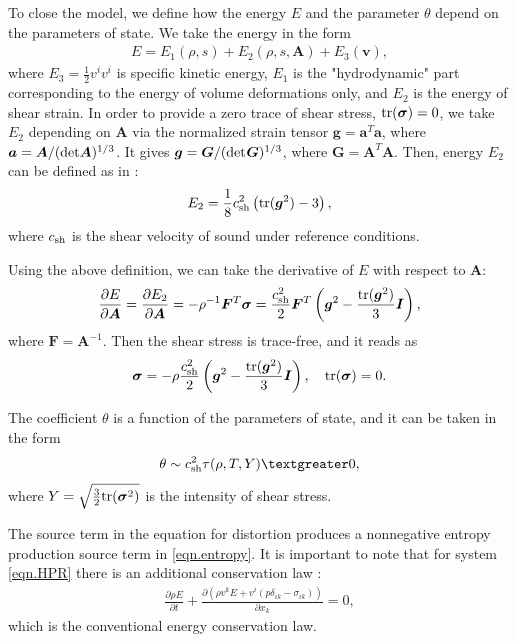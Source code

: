 \documentclass[3p,times,table]{article}
\renewcommand{\AA}{{\bm{A}}}
\renewcommand{\aa}{{\bm{a}}}
\renewcommand{\ggg}{{\bm{g}}}
\newcommand{\GG}{{\boldsymbol{G}}}
\newcommand{\vv}{{\bm{v}}}
\newcommand{\FF}{{\bm{F}}}
\newcommand{\tr}{\textnormal{tr}}
\newcommand{\csh}{c_{\rm sh}}
\begin{document}
To close the model, we define how the energy $E$ and the parameter $\theta$ depend on the parameters of state.
We take the energy in the form
\begin{align}
E=E_1(\rho,s)+E_2(\rho,s,\AA)+E_3(\vv), \label{energy}
\end{align}
where $E_3=\frac{1}{2}v^iv^i$ is specific kinetic energy,
$E_1$ is the "hydrodynamic" part corresponding to the energy of  volume deformations only,
and $E_2$ is the energy of shear strain.
In order to provide a zero trace of shear stress, $\tr (\bm{\sigma})=0$, we take 
$E_2$ depending on $\AA$ via the normalized strain tensor $\ggg=\aa^T\aa$, 
where 
$\aa=\AA/(\det\hspace{-0.6mm}\AA)^{1/3}$. It gives  
$\ggg=\GG/(\det\hspace{-0.4mm}\GG)^{1/3}$, where 
$\GG=\AA^T\AA$. Then, energy $ E_2 $ can be 
defined as in \cite{Ndanou2014}:
\begin{align}
E_2=\frac{1}{8}\csh^2\left(\tr({\ggg^2})-3\right),
\end{align}
where $\csh$ is the shear velocity of sound under reference conditions.

Using the above definition, we can take
the derivative of $E$ with respect to $\AA$:
\begin{align} \label{EderivA}
\frac{\partial E}{\partial \AA}=\frac{\partial E_2}{\partial 
\AA}=-\rho^{-1}\FF^T\bm{\sigma}=
\frac{\csh^2}{2} \bm{F}^T \left(\ggg^2-\frac{\tr({\ggg^2})}{3} \bm{I} \right),
\end{align}
where $\FF=\AA^{-1}$.
Then the shear stress is trace-free, and it reads as
\begin{align}
\bm{\sigma} =-\rho \frac{\csh^2}{2}\left(\ggg^2-\frac{\tr({\ggg^2})}{3} \bm{I}
\right), \quad  \tr(\bm{\sigma})=0.
\end{align} 

The coefficient $\theta$ is a function of the parameters of state, and it can 
be taken in the form \cite{DPRZ2016,HYP2016,Hyper-Hypo2019}
\begin{align}
\theta \sim \csh^2 \tau (\rho,T,Y) \textgreater 0,
\end{align}
where $Y=\sqrt{\frac32\tr(\bm{\sigma}^2)}$ is the intensity of shear stress.

The source term in the equation for distortion produces a nonnegative entropy production source term in \eqref{eqn.entropy}. 
It is important to note that for system \eqref{eqn.HPR} there is an additional 
conservation law \cite{SHTC-GENERIC-CMAT}:
\begin{align} \label{eqn.energy}
\displaystyle\frac{\partial \rho E}{\partial t}+
\frac{\partial \left(\rho  v^k E +v^i(p \delta_{ik}-\sigma_{ik}) 
\right)}{\partial x_k}=0,
\end{align}
which is the conventional energy conservation law.
\end{document}
